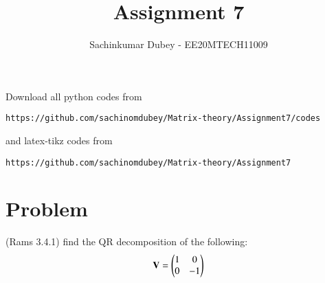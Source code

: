 \documentclass[journal,12pt,twocolumn]{IEEEtran}
\begin{document}
\def\putbox#1#2#3{\makebox[0in][l]{\makebox[#1][l]{}\raisebox{\baselineskip}[0in][0in]{\raisebox{#2}[0in][0in]{#3}}}}
     \def\rightbox#1{\makebox[0in][r]{#1}}
     \def\centbox#1{\makebox[0in]{#1}}
     \def\topbox#1{\raisebox{-\baselineskip}[0in][0in]{#1}}
     \def\midbox#1{\raisebox{-0.5\baselineskip}[0in][0in]{#1}}
\vspace{3cm}
\title{Assignment 7}
\author{Sachinkumar Dubey - EE20MTECH11009}
\maketitle
\newpage
\bigskip
\renewcommand{\thefigure}{\theenumi}
\renewcommand{\thetable}{\theenumi}
Download all python codes from 
\begin{lstlisting}
https://github.com/sachinomdubey/Matrix-theory/Assignment7/codes
\end{lstlisting}
%
and latex-tikz codes from 
%
\begin{lstlisting}
https://github.com/sachinomdubey/Matrix-theory/Assignment7
\end{lstlisting}
\section{Problem}
(Rams 3.4.1) find the QR decomposition of the following:\\
\begin{align}
\mathbf{V}=\begin{pmatrix}1 & 0 \\0 & -1\end{pmatrix}\label{eq:2.0.3}
\end{align}
\end{document}

